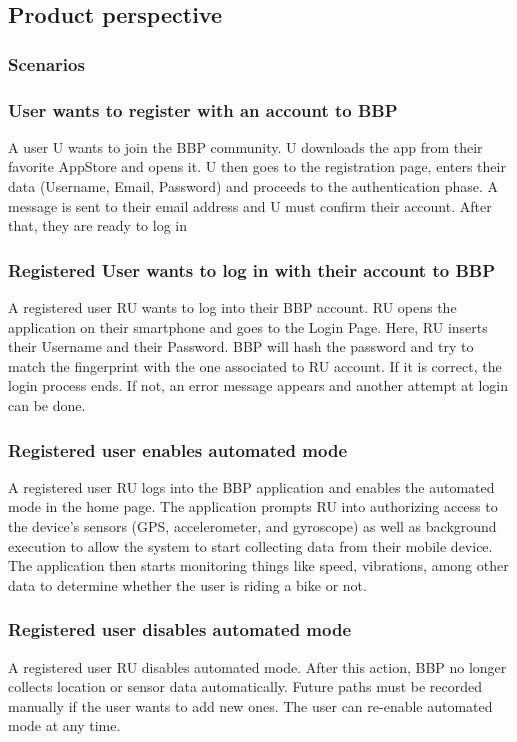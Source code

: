 \subsection{Product perspective}

\subsubsection{Scenarios}

\subsubsection*{User wants to register with an account to BBP}
A user U wants to join the BBP community. U downloads the app from their favorite AppStore and opens it. U then goes to the registration page, enters their data (Username, Email, Password) and proceeds to the authentication phase. A message is sent to their email address and U must confirm their account. After that, they are ready to log in

\subsubsection*{Registered User wants to log in with their account to BBP}
A registered user RU wants to log into their BBP account. RU opens the application on their smartphone and goes to the Login Page. Here, RU inserts their Username and their Password. BBP will hash the password and try to match the fingerprint with the one associated to RU account. If it is correct, the login process ends. If not, an error message appears and another attempt at login can be done.

\subsubsection*{Registered user enables automated mode}
A registered user RU logs into the BBP application and enables the automated mode in the home page. The application prompts RU into authorizing access to the device's sensors (GPS, accelerometer, and gyroscope) as well as background execution to allow the system to start collecting data from their mobile device. The application then starts monitoring things like speed, vibrations, among other data to determine whether the user is riding a bike or not.

\subsubsection*{Registered user disables automated mode}
A registered user RU disables automated mode. After this action, BBP no longer collects location or sensor data automatically. Future paths must be recorded manually if the user wants to add new ones. The user can re-enable automated mode at any time.

